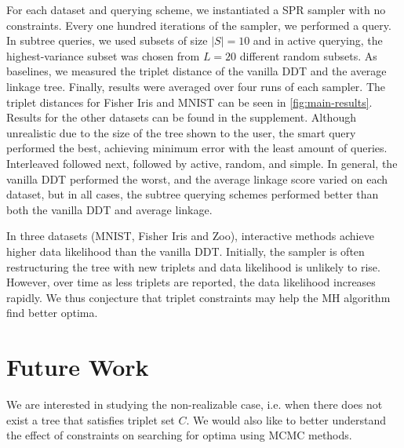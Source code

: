 For each dataset and querying scheme, we instantiated a SPR
sampler with no constraints. Every one hundred iterations of the 
sampler, we performed a query.
In subtree queries, we used subsets of size $|S| = 10$ 
and in active querying, the highest-variance subset was chosen from $L = 20$ different random subsets.
As baselines,
we measured the triplet distance of the vanilla DDT
and the average linkage tree.
Finally, results were averaged over four runs of each sampler.
The triplet distances for Fisher Iris and MNIST can be seen in \autoref{fig:main-results}. Results for the other datasets
can be found in the supplement.
Although unrealistic due to the size of the tree shown to the user, 
the smart query performed the best, achieving minimum error
with the least amount of queries. Interleaved followed next,
followed by active, random, and simple. In general, the vanilla
DDT performed the worst, and the average linkage
score varied on each dataset, but in all cases, the
subtree querying schemes performed better than both the vanilla DDT
and average linkage.

In three datasets (MNIST, Fisher Iris and Zoo), 
interactive methods
achieve higher data likelihood than the vanilla DDT.
Initially, the sampler is often restructuring the tree
with new triplets
and data likelihood is unlikely to rise. However, over time
as less triplets are reported,
the data likelihood increases rapidly.
We thus conjecture that triplet constraints 
may help the MH algorithm find better optima.

\section{Future Work}
We are interested in studying the non-realizable case, i.e.
when there does not exist a tree that satisfies triplet set $C$. We would also like to better understand the effect of constraints on searching
for optima using MCMC methods.
